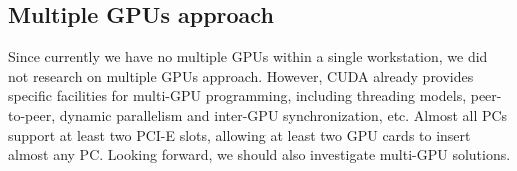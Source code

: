 \subsection*{Multiple GPUs approach}
Since currently we have no multiple GPUs within a single workstation, we did not research on multiple GPUs approach. However, CUDA already provides specific facilities for multi-GPU programming, including threading models, peer-to-peer, dynamic parallelism and inter-GPU synchronization, etc. Almost all PCs support at least two PCI-E slots, allowing at least two GPU cards to insert almost any PC. Looking forward, we should also investigate multi-GPU solutions.

